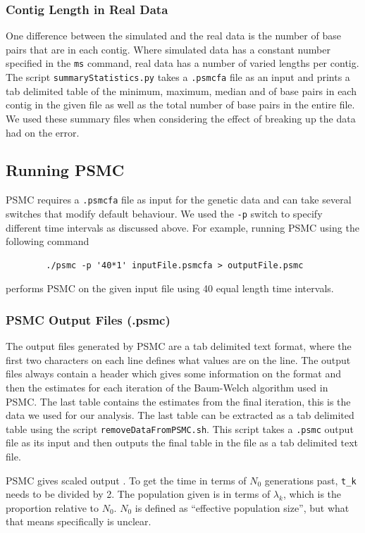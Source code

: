 \documentclass[11pt,a4paper]{article}
\begin{document}
\subsubsection{Contig Length in Real Data}\label{contigLength}
One difference between the simulated and the real data is the number of base pairs that are in each contig. Where simulated data has a constant number specified in the \verb|ms| command, real data has a number of varied lengths per contig. The script \verb|summaryStatistics.py| takes a \verb|.psmcfa| file as an input and prints a tab delimited table of the minimum, maximum, median and of base pairs in each contig in the given file as well as the total number of base pairs in the entire file. We used these summary files when considering the effect of breaking up the data had on the error.

\subsection{Running PSMC}
PSMC requires a \verb|.psmcfa| file as input for the genetic data and can take several switches that modify default behaviour. We used the \verb|-p| switch to specify different time intervals as discussed above. For example, running PSMC using the following command
\begin{verbatim}
		./psmc -p '40*1' inputFile.psmcfa > outputFile.psmc
\end{verbatim}
performs PSMC on the given input file using 40 equal length time intervals.

\subsubsection{PSMC Output Files (.psmc)}
The output files generated by PSMC are a tab delimited text format, where the first two characters on each line defines what values are on the line. The output files always contain a header which gives some information on the format and then the estimates for each iteration of the Baum-Welch algorithm used in PSMC. The last table contains the estimates from the final iteration, this is the data we used for our analysis. The last table can be extracted as a tab delimited table using the script \verb|removeDataFromPSMC.sh|. This script takes a \verb|.psmc| output file as its input and then outputs the final table in the file as a tab delimited text file.

PSMC gives scaled output \cite{li2011inference}. To get the time in terms of $N_0$ generations past, \verb|t_k| needs to be divided by 2. The population given is in terms of $\lambda_k$, which is the proportion relative to $N_0$. $N_0$ is defined as ``effective population size'', but what that means specifically is unclear.
\end{document}
